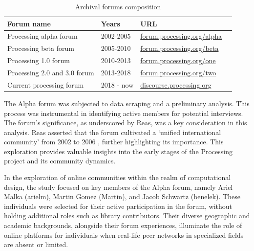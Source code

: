 \begin{table}[h]
	\raggedright
	\begin{adjustbox}{center}
		\begin{tabular}{l l l c}
			\toprule
			Forum name                   & Years      & URL                                                                    \\
			\midrule
			Processing alpha forum       & 2002-2005  & \href{https://forum.processing.org/alpha/}{forum.processing.org/alpha} \\
			Processing beta forum        & 2005-2010  & \href{https://forum.processing.org/beta/}{forum.processing.org/beta}   \\
			Processing 1.0 forum         & 2010-2013  & \href{https://forum.processing.org/one/}{forum.processing.org/one}     \\
			Processing 2.0 and 3.0 forum & 2013-2018  & \href{https://forum.processing.org/two/}{forum.processing.org/two}     \\
			Current processing forum     & 2018 - now & \href{https://discourse.processing.org/}{discourse.processing.org}     \\
			\bottomrule
		\end{tabular}
	\end{adjustbox}
	\caption{Archival forums composition}
	\label{table:forums}
\end{table}

The Alpha forum was subjected to data scraping and a preliminary analysis. This process was instrumental in identifying active members for potential interviews. The forum’s significance, as underscored by Reas, was a key consideration in this analysis. Reas asserted that the forum cultivated a ‘unified international community’ from 2002 to 2006 \parencite[331]{conradGraphicDesignPostdigital2021}, further highlighting its importance. This exploration provides valuable insights into the early stages of the Processing project and its community dynamics.

In the exploration of online communities within the realm of computational design, the study focused on key members of the Alpha forum, namely Ariel Malka (arielm), Martin Gomez (Martin), and Jacob Schwartz (benelek). These individuals were selected for their active participation in the forum, without holding additional roles such as library contributors. Their diverse geographic and academic backgrounds, alongside their forum experiences, illuminate the role of online platforms for individuals when real-life peer networks in specialized fields are absent or limited.

